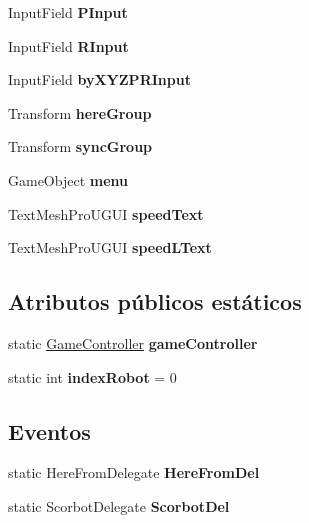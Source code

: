 \begin{DoxyCompactItemize}
Input\+Field {\bfseries P\+Input}
\item 
\mbox{\label{class_game_controller_a909684cd4f88d27998aab5517d01fb41}} 
Input\+Field {\bfseries R\+Input}
\item 
\mbox{\label{class_game_controller_a0e29079c699df359be73fc23f7c1dbc6}} 
Input\+Field {\bfseries by\+X\+Y\+Z\+P\+R\+Input}
\item 
\mbox{\label{class_game_controller_adc5d9c82337016042d0a4b7a431b8a0e}} 
Transform {\bfseries here\+Group}
\item 
\mbox{\label{class_game_controller_aef6447cf8e9a9e5945a45e0a0d4cbeea}} 
Transform {\bfseries sync\+Group}
\item 
\mbox{\label{class_game_controller_af4c293b5d621fe28f1e6b72f9efa293f}} 
Game\+Object {\bfseries menu}
\item 
\mbox{\label{class_game_controller_ae2a547ae9f7294b4c3d7064ff037b7d1}} 
Text\+Mesh\+Pro\+U\+G\+UI {\bfseries speed\+Text}
\item 
\mbox{\label{class_game_controller_a80a5ddb548350ff8522690213155ffc7}} 
Text\+Mesh\+Pro\+U\+G\+UI {\bfseries speed\+L\+Text}
\end{DoxyCompactItemize}
\subsection*{Atributos públicos estáticos}
\begin{DoxyCompactItemize}
\item 
\mbox{\label{class_game_controller_a46ccbbf4e13ee78f28da6b0ed2595cf3}} 
static \mbox{\hyperlink{class_game_controller}{Game\+Controller}} {\bfseries game\+Controller}
\item 
\mbox{\label{class_game_controller_a1bd43431306b8ca49893d36b649d251c}} 
static int {\bfseries index\+Robot} = 0
\end{DoxyCompactItemize}
\subsection*{Eventos}
\begin{DoxyCompactItemize}
\item 
\mbox{\label{class_game_controller_acb69ab50fb463c78d7d47e94edf85a9e}} 
static Here\+From\+Delegate {\bfseries Here\+From\+Del}
\item 
\mbox{\label{class_game_controller_a801ce04758bfd9d108cc1e0161bb50d8}} 
static Scorbot\+Delegate {\bfseries Scorbot\+Del}
\end{DoxyCompactItemize}
